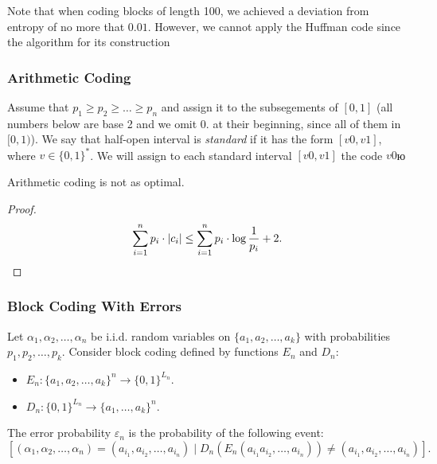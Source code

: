 Note that when coding blocks of length 100, we achieved a deviation from entropy of no more that $0.01$. However, we cannot apply the Huffman code since the algorithm for its construction 

\subsubsection{Arithmetic Coding}


\begin{definition}
    Assume that $p_{1} \ge p_{2} \ge \dots \ge p_{n}$ and assign it to the subsegements of $[0, 1]$ (all numbers below are base 2 and we omit $0.$ at their beginning, since all of them in $[0, 1)$).
    We say that half-open interval is \emph{standard} if it has the form $[v 0, v 1]$, where $v \in \{ 0, 1 \}^{\ast}$.
    We will assign to each standard interval $[v 0, v1]$ the code $v0$ю
\end{definition}

\begin{statement}
    Arithmetic coding is not as optimal.
\end{statement}
\begin{proof}
    \[\sum _{ i = 1 }^{ n } p_{i} \cdot |c_{i}| \le \sum _{ i = 1 }^{ n } p_{i} \cdot \log \frac{1}{p_{i}} + 2. \qedhere \]
\end{proof}

\subsubsection{Block Coding With Errors}

Let $\alpha_{1}, \alpha_{2}, \dots, \alpha_{n}$ be i.i.d. random variables on $\{ a_{1}, a_{2}, \dots, a_{k} \}$ with probabilities $p_{1}, p_{2}, \dots, p_{k}$.
Consider block coding defined by functions $E_{n}$ and $D_{n}$:
\begin{itemize}
    \item $E_{n}: \{ a_{1}, a_{2}, \dots, a_{k} \}^{n} \to \{ 0, 1 \}^{L_{n}}$.
    \item $D_{n}: \{ 0, 1 \}^{L_{n}} \to \{ a_{1}, \dots, a_{k} \}^{n}$.
\end{itemize}

The error probability $\varepsilon_{n}$ is the probability of the following event:
\[
\left[ (\alpha_{1}, \alpha_{2}, \dots, \alpha_{n}) = (a_{i_{1}}, a_{i_{2}}, \dots, a_{i_{n}}) \mid D_{n}(E_{n}(a_{i_{1}}a_{i_{2}}, \dots, a_{i_{n}})) \ne (a_{i_{1}}, a_{i_{2}}, \dots, a_{i_{n}}) \right].
\]


